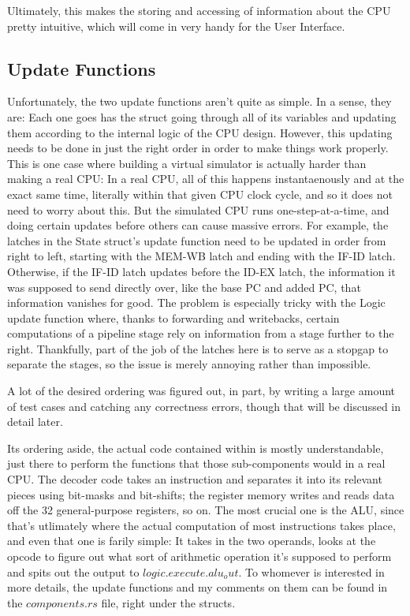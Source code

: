\documentclass[12pt,twoside]{reedthesis}
\begin{document}
Ultimately, this makes the storing and accessing of information about the CPU pretty intuitive, which will come in very handy for the User Interface.

\subsection*{Update Functions}

Unfortunately, the two update functions aren't quite as simple. In a sense, they are: Each one goes has the struct going through all of its variables and updating them according to the internal logic of the CPU design. However, this updating needs to be done in just the right order in order to make things work properly. This is one case where building a virtual simulator is actually harder than making a real CPU: In a real CPU, all of this happens instantaenously and at the exact same time, literally within that given CPU clock cycle, and so it does not need to worry about this. But the simulated CPU runs one-step-at-a-time, and doing certain updates before others can cause massive errors. For example, the latches in the State struct's update function need to be updated in order from right to left, starting with the MEM-WB latch and ending with the IF-ID latch. Otherwise, if the IF-ID latch updates before the ID-EX latch, the information it was supposed to send directly over, like the base PC and added PC, that information vanishes for good. The problem is especially tricky with the Logic update function where, thanks to forwarding and writebacks, certain computations of a pipeline stage rely on information from a stage further to the right. Thankfully, part of the job of the latches here is to serve as a stopgap to separate the stages, so the issue is merely annoying rather than impossible.

A lot of the desired ordering was figured out, in part, by writing a large amount of test cases and catching any correctness errors, though that will be discussed in detail later.

Its ordering aside, the actual code contained within is mostly understandable, just there to perform the functions that those sub-components would in a real CPU. The decoder code takes an instruction and separates it into its relevant pieces using bit-masks and bit-shifts; the register memory writes and reads data off the 32 general-purpose registers, so on. The most crucial one is the ALU, since that's  utlimately where the actual computation of most instructions takes place, and even that one is farily simple: It takes in the two operands, looks at the opcode to figure out what sort of arithmetic operation it's supposed to perform and spits out the output to $logic.execute.alu_out$. To whomever is interested in more details, the update functions and my comments on them can be found in the $components.rs$ file, right under the structs.
\end{document}
